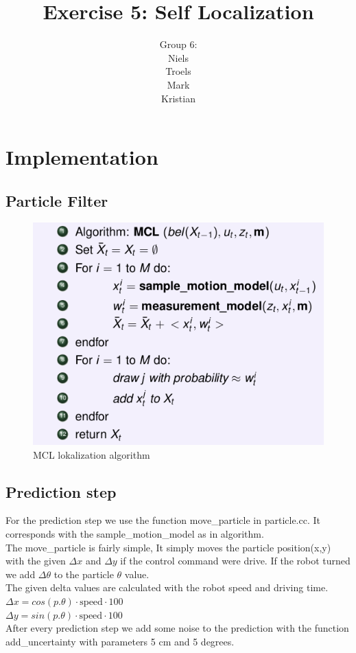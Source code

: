 \documentclass[a4paper,12pt]{article}
\title{Exercise 5: Self Localization}
\author{Group 6:\\Niels\\Troels\\Mark\\Kristian}
\begin{document}
\maketitle

\section{Implementation}

\subsection{Particle Filter}
\begin{figure}[htp]
\centering
\includegraphics[scale=0.50]{MCL.png}
\caption{MCL lokalization algorithm}
\label{MCL}
\end{figure}

\subsection{Prediction step}
For the prediction step we use the function move\_particle in particle.cc. It corresponds with the sample\_motion\_model as in algorithm. \\
The move\_particle is fairly simple, It simply moves the particle position(x,y) with the given $\Delta x $ and $\Delta y$ if the control command were drive. If the robot turned we add $\Delta \theta$ to the particle $\theta$ value. \\
The given delta values are calculated with the robot speed and driving time. \\
$\Delta x = cos(p.\theta)\cdot\text{speed}\cdot 100$ \\
$\Delta y = sin(p.\theta)\cdot\text{speed}\cdot 100$ \\
After every prediction step we add some noise to the prediction with the function add\_uncertainty with parameters 5 cm and 5 degrees. 
\end{document}
